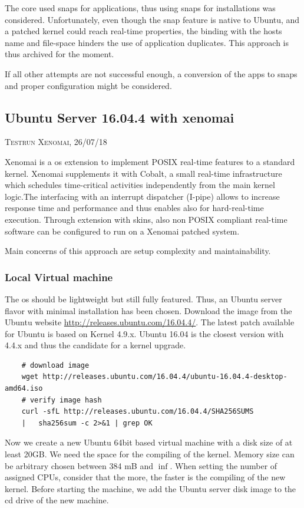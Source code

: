 \documentclass[]{scrartcl}
\begin{document}
The core used snaps for applications, thus using snaps for installations was considered. Unfortunately, even though the snap feature is native to Ubuntu, and a patched kernel could reach real-time properties, the binding with the hosts name and file-space hinders the use of application duplicates. This approach is thus archived for the moment.

If all other attempts are not successful enough, a conversion of the apps to snaps and proper configuration might be considered.

\subsection{Ubuntu Server 16.04.4 with xenomai}

{\small\textsc{Testrun Xenomai, 26/07/18} \bigskip}

Xenomai is a os extension to implement POSIX real-time features to a standard kernel. Xenomai supplements it with Cobalt, a small real-time infrastructure which schedules time-critical activities independently from the main kernel logic.The interfacing with an interrupt dispatcher (I-pipe) allows to increase response time and performance and thus enables also for hard-real-time execution. Through extension with skins, also non POSIX compliant real-time software can be configured to run on a Xenomai patched system.

Main concerns of this approach are setup complexity and maintainability.

\subsubsection{Local Virtual machine}
\label{sec:xenoinst}
The os should be lightweight but still fully featured. Thus, an Ubuntu server flavor with minimal installation has been chosen. Download the image from the Ubuntu website \url{http://releases.ubuntu.com/16.04.4/}. The latest patch available for Ubuntu is based on Kernel 4.9.x. Ubuntu 16.04 is the closest version with 4.4.x and thus the candidate for a kernel upgrade.

\begin{verbatim}
	# download image
	wget http://releases.ubuntu.com/16.04.4/ubuntu-16.04.4-desktop-amd64.iso
	# verify image hash
	curl -sfL http://releases.ubuntu.com/16.04.4/SHA256SUMS
	|	sha256sum -c 2>&1 | grep OK
\end{verbatim}

Now we create a new Ubuntu 64bit based virtual machine with a disk size of at least 20GB. We need the space for the compiling of the kernel. Memory size can be arbitrary chosen between 384 mB and $\inf$. When setting the number of assigned CPUs, consider that the more, the faster is the compiling of the new kernel.
Before starting the machine, we add the Ubuntu server disk image to the cd drive of the new machine.
\end{document}
